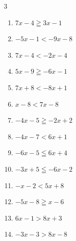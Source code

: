\begin{multicols}{3}
\begin{enumerate}
  \item $7x-4\geqq 3x-1$


  \item $-5x-1<-9x-8$


  \item $7x-4<-2x-4$

        \phantom{$\displaystyle x<0$}

  \item $5x-9\geqq -6x-1$


\columnbreak %

  \item $7x+8<-8x+1$


  \item $x-8<7x-8$

        \phantom{$\displaystyle x>0$}

  \item $-4x-5\geqq -2x+2$


  \item $-4x-7<6x+1$


  \item $-6x-5\leqq 6x+4$


  \item $-3x+5\leqq -6x-2$


  \item $-x-2<5x+8$


  \item $-5x-8\geqq x-6$


  \item $6x-1>8x+3$

        \phantom{$\displaystyle x<-2$}

  \item $-3x-3>8x-8$


\end{enumerate}
\end{multicols}
